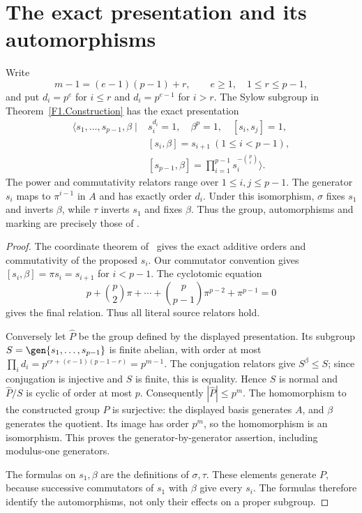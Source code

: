 \section{The exact presentation and its automorphisms}
\begin{theorem}\label{F1.Presentation}
Write
\[
 m-1=(e-1)(p-1)+r,\qquad e\geq1,\quad1\leq r\leq p-1,
\]
and put $d_i=p^e$ for $i\leq r$ and $d_i=p^{e-1}$ for $i>r$.
The Sylow subgroup in Theorem~\ref{F1.Construction} has the exact
presentation
\begin{align*}
 \langle s_1,\ldots,s_{p-1},\beta\mid{}
 &s_i^{d_i}=1,\quad\beta^p=1,\quad [s_i,s_j]=1,\\
 &[s_i,\beta]=s_{i+1}\ (1\leq i<p-1),\\
 &[s_{p-1},\beta]=\prod_{i=1}^{p-1}s_i^{-\binom pi}\rangle.
\end{align*}
The power and commutativity relators range over $1\leq i,j\leq p-1$.
The generator $s_i$ maps to $\pi^{i-1}$ in $A$ and has exactly
order $d_i$. Under this isomorphism, $\sigma$ fixes $s_1$ and
inverts $\beta$, while $\tau$ inverts $s_1$ and fixes $\beta$.
Thus the group, automorphisms and marking are precisely those of
\cite[Section 5 and Theorem 5.1]{HFLQ}.
\end{theorem}
\begin{proof}
The coordinate theorem of~\cite{UF} gives the exact additive orders
and commutativity of the proposed $s_i$. Our commutator convention
gives $[s_i,\beta]=\pi s_i=s_{i+1}$ for $i<p-1$.
The cyclotomic equation
\[
 p+\binom p2\pi+\cdots+\binom p{p-1}\pi^{p-2}
       +\pi^{p-1}=0
\]
gives the final relation. Thus all literal source relators hold.

Conversely let $\widehat P$ be the group defined by the displayed
presentation. Its subgroup $S=\gen{s_1,\ldots,s_{p-1}}$ is finite
abelian, with order at most
$\prod_i d_i=p^{er+(e-1)(p-1-r)}=p^{m-1}$.
The conjugation relators give $S^\beta\leq S$; since conjugation
is injective and $S$ is finite, this is equality. Hence $S$ is normal
and $\widehat P/S$ is cyclic of order at most $p$.
Consequently $|\widehat P|\leq p^m$. The homomorphism to the
constructed group $P$ is surjective: the displayed basis generates
$A$, and $\beta$ generates the quotient. Its image has order
$p^m$, so the homomorphism is an isomorphism. This proves the
generator-by-generator assertion, including modulus-one generators.

The formulas on $s_1,\beta$ are the definitions of $\sigma,\tau$.
These elements generate $P$, because successive commutators of
$s_1$ with $\beta$ give every $s_i$. The formulas therefore identify
the automorphisms, not only their effects on a proper subgroup.
\end{proof}

